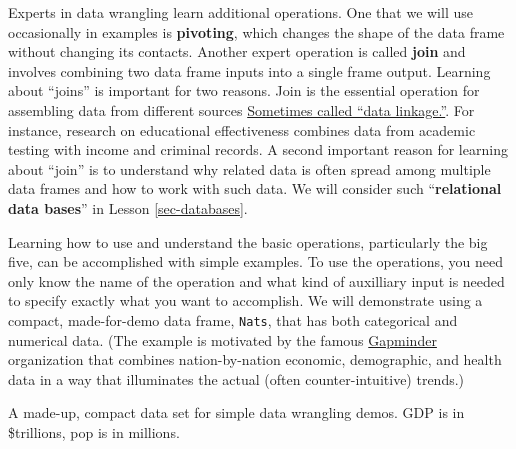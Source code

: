\documentclass[
  letterpaper,
  DIV=11,
  numbers=noendperiod,
  oneside]{scrartcl}
\begin{document}
Experts in data wrangling learn additional operations. One that we will
use occasionally in examples is \textbf{pivoting}, which changes the
shape of the data frame without changing its contacts. Another expert
operation is called \textbf{join} and involves combining two data frame
inputs into a single frame output. Learning about ``joins'' is important
for two reasons. Join is the essential operation for assembling data
from different sources \href{.aside}{Sometimes called ``data
linkage.''}. For instance, research on educational effectiveness
combines data from academic testing with income and criminal records. A
second important reason for learning about ``join'' is to understand why
related data is often spread among multiple data frames and how to work
with such data. We will consider such ``\textbf{relational data bases}''
in Lesson \ref{sec-databases}.

Learning how to use and understand the basic operations, particularly
the big five, can be accomplished with simple examples. To use the
operations, you need only know the name of the operation and what kind
of auxilliary input is needed to specify exactly what you want to
accomplish. We will demonstrate using a compact, made-for-demo data
frame, \texttt{Nats}, that has both categorical and numerical data. (The
example is motivated by the famous \href{gapminder.org}{Gapminder}
organization that combines nation-by-nation economic, demographic, and
health data in a way that illuminates the actual (often
counter-intuitive) trends.)

\begin{marginfigure}

\caption{\label{tbl-nats-demo}A made-up, compact data set for simple
data wrangling demos. GDP is in \$trillions, pop is in millions.}


\end{marginfigure}%
\end{document}
